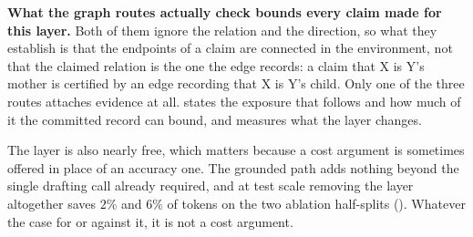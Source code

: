 \textbf{What the graph routes actually check bounds every claim made for
this layer.} Both of them ignore the relation and the direction, so what
they establish is that the endpoints of a claim are connected in the
environment, not that the claimed relation is the one the edge records:
a claim that X is Y's mother is certified by an edge recording that X is
Y's child. Only one of the three routes attaches evidence at all.
 states the exposure that follows and how
much of it the committed record can bound, and  measures
what the layer changes.

The layer is also nearly free, which matters because a cost argument is
sometimes offered in place of an accuracy one. The grounded path adds
nothing beyond the single drafting call already required, and at test
scale removing the layer altogether saves $2\%$ and $6\%$ of tokens on
the two ablation half-splits (). Whatever the case
for or against it, it is not a cost argument.

